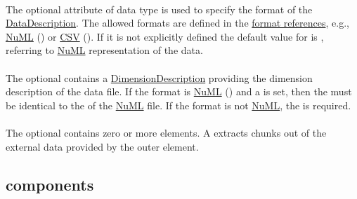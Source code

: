 \paragraph*{}
\label{sec:format}
The optional  attribute of data type \hyperref[type:anyURI]{} is used to specify the format of the \hyperref[class:dataDescription]{DataDescription}. The allowed formats are defined in the \hyperref[sec:dataFormatURI]{format references}, e.g., \hyperref[sec:dataFormatNUML]{NuML} () or \hyperref[sec:dataFormatCSV]{CSV} (). If it is not explicitly defined the default value for  is , referring to \hyperref[sec:dataFormatNUML]{NuML} representation of the data.

\paragraph*{}
\label{sec:dimensionDescription}
The optional  contains a \hyperref[class:dimensionDescription]{DimensionDescription} providing the dimension description of the data file. If the format is \hyperref[sec:dataFormatNUML]{NuML} () and a  is set, then the  must be identical to the  of the \hyperref[sec:dataFormatNUML]{NuML} file. If the format is not \hyperref[sec:dataFormatNUML]{NuML}, the  is required.

\paragraph*{}
\label{class:listOfDataSources}
The optional  contains zero or more \SedDataSource elements. A \SedDataSource extracts chunks out of the external data provided by the outer \SedDataDescription element. 

\subsection{ components}
\label{class:dataDescriptionComponents}



